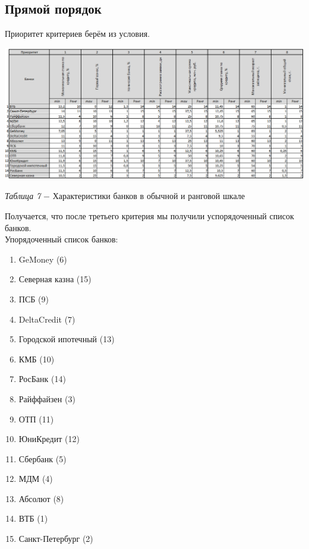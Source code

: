 \documentclass[14pt,fleqn]{extarticle}
\begin{document}
	\subsection*{Прямой порядок}
	Приоритет критериев берём из условия.
	\begin{center}
		\includegraphics[scale=0.55]{9}
	\end{center}
	\begin{center}
		\textit{Таблица 7} $-$ Характеристики банков в обычной и ранговой шкале
	\end{center}
	Получается, что после третьего критерия мы получили успорядоченный список банков.\\
	\newpage
	Упорядоченный список банков:
	\begin{enumerate}[nolistsep]
		\item GeMoney (6)
		\item Северная казна (15)
		\item ПСБ (9)
		\item DeltaCredit (7)
		\item Городской ипотечный (13)
		\item КМБ (10)
		\item РосБанк (14)
		\item Райффайзен (3)
		\item ОТП (11)
		\item ЮниКредит (12)
		\item Сбербанк (5)
		\item МДМ (4)
		\item Абсолют (8)
		\item ВТБ (1)
		\item Санкт-Петербург (2)
	\end{enumerate}
\end{document}

